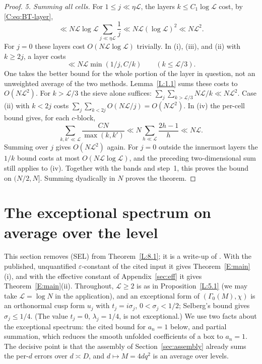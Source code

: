 \documentclass[10pt,reqno]{amsart}
\theoremstyle{definition}
\numberwithin{equation}{section}
\newcommand{\cL}{\mathcal L}
\begin{document}
\begin{proof}
\smallskip\noindent
\emph{5. Summing all cells.}
For $1\leq j\ll\eta\cL$, the layers $k\leq C_1\log\cL$ cost,
by \eqref{C:eq:BT-layer},
\[
 \ll N\cL\log\cL\sum_{j\ll\eta\cL}\frac1j
 \ll N\cL(\log\cL)^2\ll N\cL^2.
\]
For $j=0$ these layers cost $O(N\cL\log\cL)$ trivially.
In (i), (iii), and (ii) with $k\geq2j$, a layer costs
\[
 \ll N\cL\min(1/j,C/k)\qquad(k\leq\cL/3).
\]
One takes the better bound for the whole portion of the layer in
question, not an unweighted average of the two methods.
Lemma~\ref{L:1.1} sums these costs to $O(N\cL^2)$.
For $k>\cL/3$ the sieve alone suffices:
$\sum_j\sum_{k>\cL/3}N\cL/k\ll N\cL^2$.
Case (ii) with $k<2j$ costs
$\sum_j\sum_{k<2j}O(N\cL/j)=O(N\cL^2)$.
In (iv) the per-cell bound gives, for each $c$-block,
\[
 \sum_{k,k'\ll\cL}\frac{CN}{\max(k,k')}
 \ll N\sum_{h\ll\cL}\frac{2h-1}{h}\ll N\cL.
\]
Summing over $j$ gives $O(N\cL^2)$ again.  For $j=0$ outside the
innermost layers the $1/k$ bound costs at most $O(N\cL\log\cL)$,
and the preceding two-dimensional sum still applies to (iv).
Together with the bands and step~1, this proves the bound on
$(N/2,N]$.  Summing dyadically in $N$ proves the theorem.
\end{proof}

\section{The exceptional spectrum on average over the level}\label{sec:exc}
This section removes (SEL) from Theorem~\ref{L:8.1}; it is a write-up of
\cite{TTL2}. With the published, unquantified $\varepsilon$-constant of the
cited input it gives Theorem~\ref{E:main}(i), and with the effective
constant of Appendix~\ref{sec:eff} it gives Theorem~\ref{E:main}(ii). Throughout, $\cL\ge2$ is as in
Proposition~\ref{L:5.1} (we may take $\cL=\log N$ in the application),
and an exceptional form of $(\Gamma_0(M),\chi)$ is an orthonormal cusp
form $u_j$ with $t_j=i\sigma_j$, $0<\sigma_j<1/2$; Selberg's bound
\cite[Theorem~4]{DI} gives $\sigma_j\le1/4$. (The value $t_j=0$,
$\lambda_j=1/4$, is not exceptional.) We use two facts about the
exceptional spectrum: the cited bound for $a_n=1$ below, and partial
summation, which reduces the smooth unfolded coefficients of a box to
$a_n=1$. The decisive point is that the assembly of
Section~\ref{sec:assembly} already sums the per-$d$ errors over $d\asymp D$,
and $d\mapsto M=4dq^2$ is an average over levels.
\end{document}
